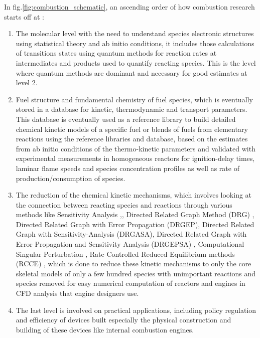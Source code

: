 In fig.\ref{fig:combustion_schematic}, an ascending order of how combustion research starts off at :
\begin{enumerate}
        \item The molecular level with the need to understand species electronic structures using statistical theory and ab initio conditions, it includes those calculations of transitions states using quantum methods for reaction rates at intermediates and products used to quantify reacting species. This is the level where quantum methods are dominant and necessary for good estimates at level 2.
        \item Fuel structure and fundamental chemistry of fuel species, which is eventually stored in a database for kinetic, thermodynamic and transport parameters. This database is eventually used as a reference library to build detailed chemical kinetic models of a specific fuel or blends of fuels from elementary reactions using the reference libraries and database, based on the estimates from ab initio conditions of the thermo-kinetic parameters and validated with experimental measurements in homogeneous reactors for ignition-delay times, laminar flame speeds and species concentration profiles as well as rate of production/consumption of species.
        \item The reduction of the chemical kinetic mechanisms, which involves looking at the connection between reacting species and reactions through various methods like Sensitivity Analysis \cite{Rabitz1983SensitivityKinetics},\cite{Turanyi1990SensitivityApplications}, Directed Related Graph Method (DRG) \cite{Lu2005AReduction}, Directed Related Graph with Error Propagation (DRGEP)\cite{Pepiot-Desjardins2008AnMechanisms}, Directed Related Graph with Sensitivity-Analysis (DRGASA)\cite{Sankaran2007StructureFlame}\cite{Zheng2007Experimental13-butadiene}, Directed Related Graph with Error Propagation and Sensitivity Analysis (DRGEPSA) \cite{Niemeyer2010SkeletalAnalysis}, Computational Singular Perturbation \cite{Massias1999AnData}, Rate-Controlled-Reduced-Equilibrium methods (RCCE) \cite{Keck1971Rate-controlledMixtures}, which is done to reduce these kinetic mechanisms to only the core skeletal models of only a few hundred species with unimportant reactions and species removed for easy numerical computation of reactors and engines in CFD analysis that engine designers use.
        \item The last level is involved on practical applications, including policy regulation and efficiency of devices built especially the physical construction and building of these devices like internal combustion engines.
\end{enumerate}  

